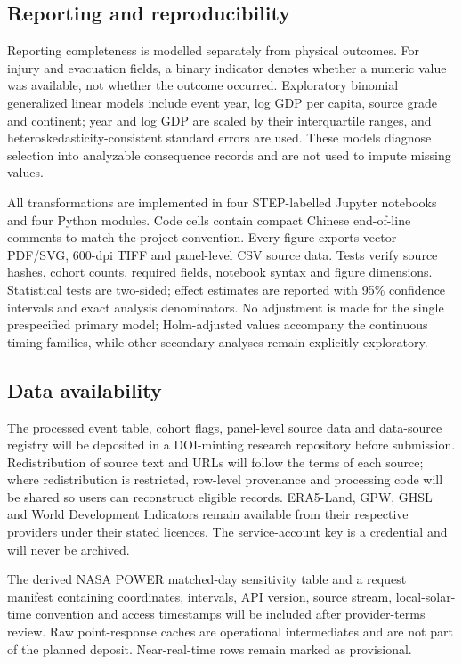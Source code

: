 \documentclass[11pt]{article}
\begin{document}
\subsection*{Reporting and reproducibility}
Reporting completeness is modelled separately from physical outcomes. For injury and evacuation fields, a binary indicator denotes whether a numeric value was available, not whether the outcome occurred. Exploratory binomial generalized linear models include event year, log GDP per capita, source grade and continent; year and log GDP are scaled by their interquartile ranges, and heteroskedasticity-consistent standard errors are used. These models diagnose selection into analyzable consequence records and are not used to impute missing values.

All transformations are implemented in four STEP-labelled Jupyter notebooks and four Python modules. Code cells contain compact Chinese end-of-line comments to match the project convention. Every figure exports vector PDF/SVG, 600-dpi TIFF and panel-level CSV source data. Tests verify source hashes, cohort counts, required fields, notebook syntax and figure dimensions. Statistical tests are two-sided; effect estimates are reported with 95\% confidence intervals and exact analysis denominators. No adjustment is made for the single prespecified primary model; Holm-adjusted values accompany the continuous timing families, while other secondary analyses remain explicitly exploratory.

\subsection*{Data availability}
The processed event table, cohort flags, panel-level source data and data-source registry will be deposited in a DOI-minting research repository before submission. Redistribution of source text and URLs will follow the terms of each source; where redistribution is restricted, row-level provenance and processing code will be shared so users can reconstruct eligible records. ERA5-Land, GPW, GHSL and World Development Indicators remain available from their respective providers under their stated licences. The service-account key is a credential and will never be archived.

The derived NASA POWER matched-day sensitivity table and a request manifest containing coordinates, intervals, API version, source stream, local-solar-time convention and access timestamps will be included after provider-terms review. Raw point-response caches are operational intermediates and are not part of the planned deposit. Near-real-time rows remain marked as provisional.
\end{document}
